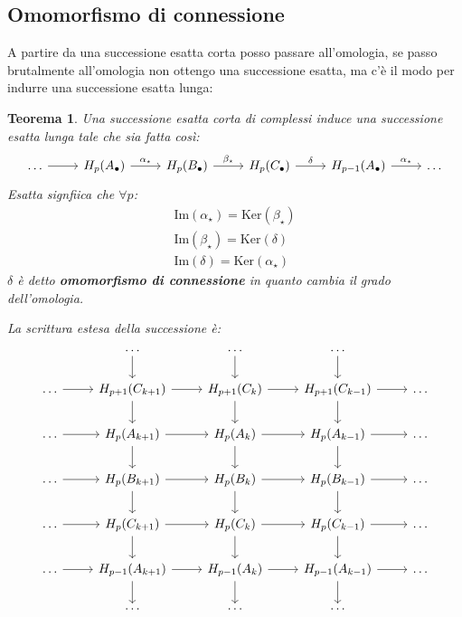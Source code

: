 \documentclass[10pt, twoside=false, x11names]{scrbook}
\newtheorem{theorem}{Teorema}[section]
\newcommand{\im}[1]{\mathrm{Im}( #1 )}
\renewcommand{\ker}[1]{\mathrm{Ker}( #1)}
\begin{document}
\subsection{Omomorfismo di connessione}
A partire da una successione esatta corta
posso passare all'omologia, se passo brutalmente
all'omologia non ottengo una successione esatta,
ma c'è il modo per indurre una successione esatta lunga:
\begin{theorem}
  Una successione esatta corta di complessi induce una successione
  esatta lunga tale che sia fatta così:
  \[
    \begin{tikzcd}
      \dots \arrow{r}{} & H_p(A_\bullet) \arrow{r}{\alpha_\star} & H_p(B_\bullet) \arrow{r}{\beta_\star} & H_p(C_\bullet) \arrow{r}{\delta}
      & H_{p-1}(A_\bullet) \arrow{r}{\alpha_\star} & \dots
    \end{tikzcd}
  \]
  Esatta signfiica che $ \forall p $:
  \begin{gather*}
    \im{\alpha_\star} = \ker{\beta_\star} \\
    \im{\beta_\star} = \ker{\delta} \\
    \im{\delta} = \ker{\alpha_\star}
  \end{gather*}
  $ \delta $ è detto \textbf{omomorfismo di connessione}
  in quanto cambia il grado dell'omologia.

  La scrittura estesa della successione è:
  \[
    \begin{tikzcd}
      {} & \dots  \arrow{d}{} &  \dots  \arrow{d}{}  &  \dots  \arrow{d}{}  & {} \\
      \dots \arrow{r}{} & H_{p+1}(C_{k+1}) \arrow{r}{} \arrow{d}{} &  H_{p+1}(C_{k}) \arrow{r}{} \arrow{d}{} &  H_{p+1}(C_{k-1}) \arrow{r}{} \arrow{d}{} & \dots \\
      \dots \arrow{r}{} & H_p(A_{k+1}) \arrow{r}{} \arrow{d}{} & H_p(A_{k})  \arrow{r}{} \arrow{d}{} & H_p(A_{k-1})  \arrow{r}{} \arrow{d}{} & \dots \\
      \dots \arrow{r}{} & H_p(B_{k+1}) \arrow{r}{} \arrow{d}{} & H_p(B_{k})  \arrow{r}{} \arrow{d}{} & H_p(B_{k-1})  \arrow{r}{} \arrow{d}{} & \dots \\
      \dots \arrow{r}{} & H_p(C_{k+1}) \arrow{r}{} \arrow{d}{} & H_p(C_{k})  \arrow{r}{} \arrow{d}{} & H_p(C_{k-1})  \arrow{r}{} \arrow{d}{} & \dots \\
      \dots \arrow{r}{} & H_{p-1}(A_{k+1}) \arrow{r}{} \arrow{d}{}  &  H_{p-1}(A_{k}) \arrow{r}{} \arrow{d}{} &  H_{p-1}(A_{k-1}) \arrow{r}{} \arrow{d}{} & \dots \\
      {} & \dots &  \dots &  \dots & {}
    \end{tikzcd}
  \]
\end{theorem}
\end{document}
